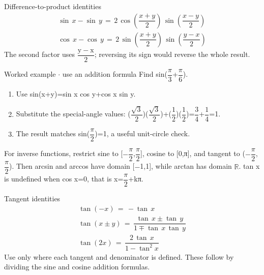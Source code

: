 \documentclass[11pt]{article}
\begin{document}
\begin{keepsection}
\begin{keepsection}
\begin{equationcard}{Difference-to-product identities}
\[ \begin{gathered} \sin \, {x}-\sin \, {y}\, =\, 2\, \cos \left(\dfrac{{x}+{y}}{2}\right)\, \sin \left(\dfrac{{x}-{y}}{2}\right) \\ \cos \, {x}-\cos \, {y}\, =\, 2\, \sin \left(\dfrac{{x}+{y}}{2}\right)\, \sin \left(\dfrac{{y}-{x}}{2}\right) \end{gathered} \]
{\small The second factor uses {\small\ensuremath{\dfrac{\mathrm{y}-\mathrm{x}}{2}}}; reversing its sign would reverse the whole result.}
\end{equationcard}

\begin{workedbox}{Worked example \ensuremath{\cdot} use an addition formula}
Find sin({\small\ensuremath{\dfrac{π}{3}}}+{\small\ensuremath{\dfrac{π}{6}}}).

\begin{enumerate}
\item Use sin(x+y)=sin x cos y+cos x sin y.
\item Substitute the special-angle values: ({\small\ensuremath{\dfrac{\sqrt{3}}{2}}})({\small\ensuremath{\dfrac{\sqrt{3}}{2}}})+({\small\ensuremath{\dfrac{1}{2}}})({\small\ensuremath{\dfrac{1}{2}}})={\small\ensuremath{\dfrac{3}{4}}}+{\small\ensuremath{\dfrac{1}{4}}}=1.
\item The result matches sin({\small\ensuremath{\dfrac{π}{2}}})=1, a useful unit-circle check.
\end{enumerate}
\end{workedbox}

For inverse functions, restrict sine to [\ensuremath{-}{\small\ensuremath{\dfrac{π}{2}}},{\small\ensuremath{\dfrac{π}{2}}}], cosine to [0,π], and tangent to (\ensuremath{-}{\small\ensuremath{\dfrac{π}{2}}},{\small\ensuremath{\dfrac{π}{2}}}). Then arcsin and arccos have domain [\ensuremath{-}1,1], while arctan has domain \ensuremath{\mathbb{R}}. tan x is undefined when cos x=0, that is x={\small\ensuremath{\dfrac{π}{2}}}+kπ.

\begin{equationcard}{Tangent identities}
\[ \begin{gathered} \tan (-{x})\, =\, -\tan \, {x} \\ \tan ({x}\pm {y})\, =\, \dfrac{\tan \, {x}\pm \tan \, {y}}{1\mp \tan \, {x}\, \tan \, {y}} \\ \tan (2{x})\, =\, \dfrac{2\, \tan \, {x}}{1-\tan ^{2}{x}} \end{gathered} \]
{\small Use only where each tangent and denominator is defined. These follow by dividing the sine and cosine addition formulas.}
\end{equationcard}


\end{keepsection}
\end{keepsection}
\end{document}
